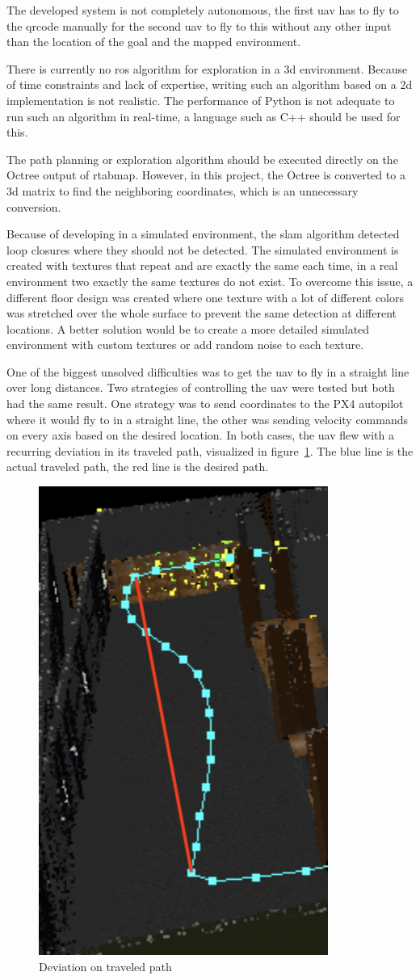 The developed system is not completely autonomous, the first \acs{uav} has to fly to the \acs{qrcode} manually for the second \acs{uav} to fly to this without any other input than the location of the goal and the mapped environment.

There is currently no \acs{ros} algorithm for exploration in a \acs{3d} environment. Because of time constraints and lack of expertise, writing such an algorithm based on a \acs{2d} implementation is not realistic. The performance of Python is not adequate to run such an algorithm in real\hyp{}time, a language such as C++ should be used for this.

The path planning or exploration algorithm should be executed directly on the Octree output of \acs{rtabmap}. However, in this project, the Octree is converted to a \acs{3d} matrix to find the neighboring coordinates, which is an unnecessary conversion.

Because of developing in a simulated environment, the \acs{slam} algorithm detected loop closures where they should not be detected. The simulated environment is created with textures that repeat and are exactly the same each time, in a real environment two exactly the same textures do not exist. To overcome this issue, a different floor design was created where one texture with a lot of different colors was stretched over the whole surface to prevent the same detection at different locations. A better solution would be to create a more detailed simulated environment with custom textures or add random noise to each texture.

One of the biggest unsolved difficulties was to get the \acs{uav} to fly in a straight line over long distances. Two strategies of controlling the \acs{uav} were tested but both had the same result. One strategy was to send coordinates to the PX4 autopilot where it would fly to in a straight line, the other was sending velocity commands on every axis based on the desired location. In both cases, the \acs{uav} flew with a recurring deviation in its traveled path, visualized in figure~\ref{fig:deviation_path}. The blue line is the actual traveled path, the red line is the desired path.

\begin{figure}[!h]
  \centering
  \includegraphics[height=0.27\linewidth]{images/deviation_path.png}
  \caption{Deviation on traveled path}
  \label{fig:deviation_path}
\end{figure}